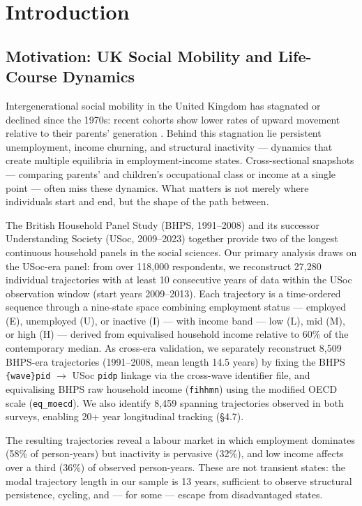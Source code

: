 \section{Introduction}

\subsection{Motivation: UK Social Mobility and Life-Course Dynamics}

Intergenerational social mobility in the United Kingdom has stagnated or declined since the 1970s: recent cohorts show lower rates of upward movement relative to their parents' generation \citep{blanden2004changes, blanden2013intergenerational, goldthorpe2008trends}. Behind this stagnation lie persistent unemployment, income churning, and structural inactivity --- dynamics that create multiple equilibria in employment-income states. Cross-sectional snapshots --- comparing parents' and children's occupational class or income at a single point --- often miss these dynamics. What matters is not merely where individuals start and end, but the shape of the path between.

The British Household Panel Study (BHPS, 1991--2008) and its successor Understanding Society (USoc, 2009--2023) together provide two of the longest continuous household panels in the social sciences. Our primary analysis draws on the USoc-era panel: from over 118,000 respondents, we reconstruct 27,280 individual trajectories with at least 10 consecutive years of data within the USoc observation window (start years 2009--2013). Each trajectory is a time-ordered sequence through a nine-state space combining employment status --- employed (E), unemployed (U), or inactive (I) --- with income band --- low (L), mid (M), or high (H) --- derived from equivalised household income relative to 60\% of the contemporary median. As cross-era validation, we separately reconstruct 8,509 BHPS-era trajectories (1991--2008, mean length 14.5 years) by fixing the BHPS \texttt{\{wave\}pid} $\to$ USoc \texttt{pidp} linkage via the cross-wave identifier file, and equivalising BHPS raw household income (\texttt{fihhmn}) using the modified OECD scale (\texttt{eq\_moecd}). We also identify 8,459 spanning trajectories observed in both surveys, enabling 20+ year longitudinal tracking (\S4.7).

The resulting trajectories reveal a labour market in which employment dominates (58\% of person-years) but inactivity is pervasive (32\%), and low income affects over a third (36\%) of observed person-years. These are not transient states: the modal trajectory length in our sample is 13 years, sufficient to observe structural persistence, cycling, and --- for some --- escape from disadvantaged states.

